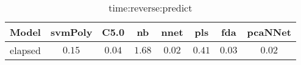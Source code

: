 \begin{table}[!ht]
	\centering
	\begin{tabular}{|c|c|c|c|c|c|c|c|}
		\hline
		Model & svmPoly & C5.0 & nb & nnet & pls & fda & pcaNNet \\ \hline
		elapsed & $0.15$ & $0.04$ & $1.68$ & $0.02$ & $0.41$ & $0.03$ & $0.02$ \\ \hline
	\end{tabular}
	\caption{time:reverse:predict}
	\label{tab:time:reverse:predict}
\end{table}
